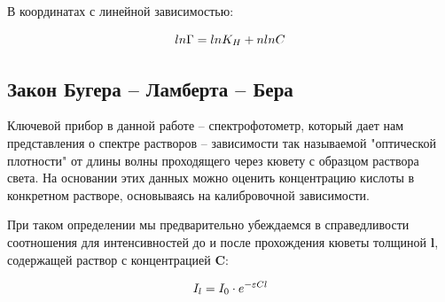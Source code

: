 \documentclass[a4paper]{article}
\begin{document}
В координатах с линейной зависимостью:
\par \vspace{0.3 cm}

\begin{center}
\[

\LARGE ln\Gamma = lnK_H + nlnC


\]
\end{center}

\subsection{\large{Закон Бугера -- Ламберта -- Бера}} 
\par

Ключевой прибор в данной работе -- спектрофотометр, который дает нам представления о спектре растворов -- зависимости так называемой "оптической плотности" \hspace{0.05 cm} от длины волны проходящего через кювету с образцом раствора света. На основании этих данных можно оценить концентрацию кислоты в конкретном растворе, основываясь на калибровочной зависимости. \par \vspace{0.3 cm}
При таком определении мы предварительно убеждаемся в справедливости соотношения для интенсивностей до и после прохождения кюветы толщиной \textbf{l}, содержащей раствор с концентрацией \textbf{C}: \vspace{0.3 cm}

\begin{center}
\[

\LARGE I_{l} = I_0 \cdot e^{-\varepsilon C l}


\]
\end{center}
\end{document}
